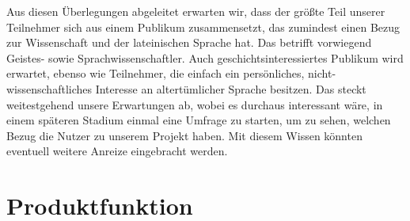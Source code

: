\documentclass{article}
\begin{document}
Aus diesen Überlegungen abgeleitet erwarten wir, dass der größte Teil unserer Teilnehmer sich aus einem Publikum zusammensetzt,
das zumindest einen Bezug zur Wissenschaft und der lateinischen Sprache hat.
Das betrifft vorwiegend Geistes- sowie Sprachwissenschaftler. Auch geschichtsinteressiertes Publikum wird erwartet,
ebenso wie Teilnehmer, die einfach ein persönliches, nicht-wissenschaftliches Interesse an altertümlicher Sprache besitzen.
Das steckt weitestgehend unsere Erwartungen ab, wobei es durchaus interessant wäre, in einem späteren Stadium einmal eine Umfrage zu starten, um zu sehen, welchen Bezug die Nutzer zu unserem Projekt haben. Mit diesem Wissen könnten eventuell weitere Anreize eingebracht werden.

\section{Produktfunktion}
\end{document}
